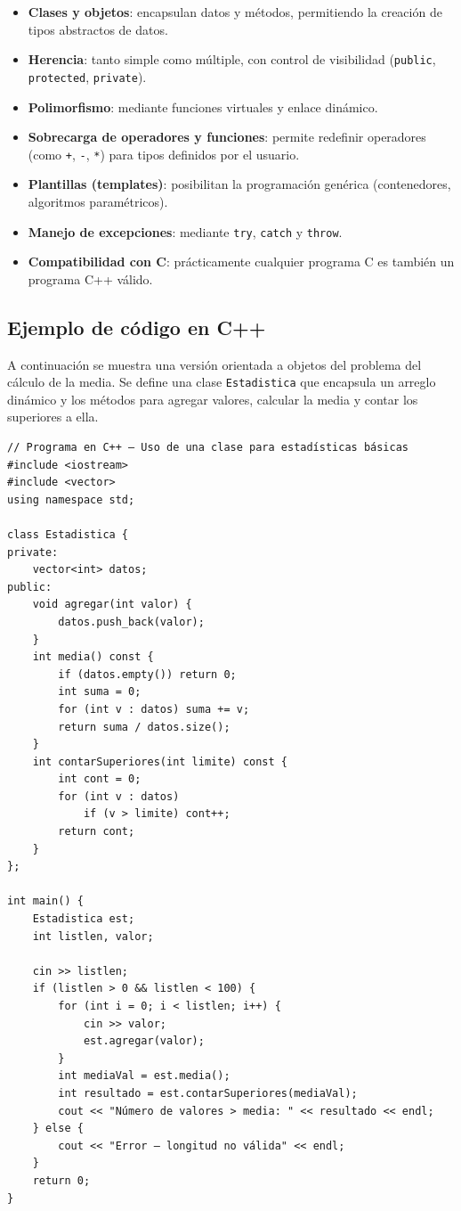 \begin{itemize}
  \item \textbf{Clases y objetos}: encapsulan datos y métodos, permitiendo la creación de tipos abstractos de datos.
  \item \textbf{Herencia}: tanto simple como múltiple, con control de visibilidad (\texttt{public}, \texttt{protected}, \texttt{private}).
  \item \textbf{Polimorfismo}: mediante funciones virtuales y enlace dinámico.
  \item \textbf{Sobrecarga de operadores y funciones}: permite redefinir operadores (como \texttt{+}, \texttt{-}, \texttt{*}) para tipos definidos por el usuario.
  \item \textbf{Plantillas (templates)}: posibilitan la programación genérica (contenedores, algoritmos paramétricos).
  \item \textbf{Manejo de excepciones}: mediante \texttt{try}, \texttt{catch} y \texttt{throw}.
  \item \textbf{Compatibilidad con C}: prácticamente cualquier programa C es también un programa C++ válido.
\end{itemize}

\subsection{Ejemplo de código en C++}

A continuación se muestra una versión orientada a objetos del problema del cálculo de la media. Se define una clase \texttt{Estadistica} que encapsula un arreglo dinámico y los métodos para agregar valores, calcular la media y contar los superiores a ella.

\begin{verbatim}
// Programa en C++ – Uso de una clase para estadísticas básicas
#include <iostream>
#include <vector>
using namespace std;

class Estadistica {
private:
    vector<int> datos;
public:
    void agregar(int valor) {
        datos.push_back(valor);
    }
    int media() const {
        if (datos.empty()) return 0;
        int suma = 0;
        for (int v : datos) suma += v;
        return suma / datos.size();
    }
    int contarSuperiores(int limite) const {
        int cont = 0;
        for (int v : datos)
            if (v > limite) cont++;
        return cont;
    }
};

int main() {
    Estadistica est;
    int listlen, valor;
    
    cin >> listlen;
    if (listlen > 0 && listlen < 100) {
        for (int i = 0; i < listlen; i++) {
            cin >> valor;
            est.agregar(valor);
        }
        int mediaVal = est.media();
        int resultado = est.contarSuperiores(mediaVal);
        cout << "Número de valores > media: " << resultado << endl;
    } else {
        cout << "Error – longitud no válida" << endl;
    }
    return 0;
}
\end{verbatim}

